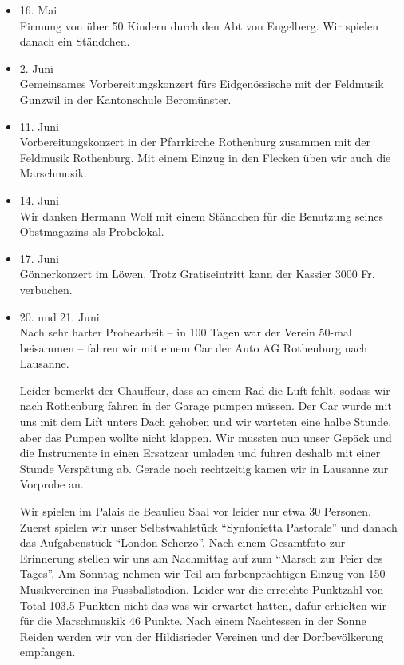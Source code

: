 \begin{multicols}{2}
\begin{itemize}
        \item[]16. Mai\\
        Firmung von über 50 Kindern durch den Abt von Engelberg. Wir spielen
        danach ein Ständchen.

        \item[]2. Juni\\
        Gemeinsames Vorbereitungskonzert fürs Eidgenössische mit der Feldmusik
        Gunzwil in der Kantonschule Beromünster.

        \item[]11. Juni\\
        Vorbereitungskonzert in der Pfarrkirche Rothenburg zusammen mit der
        Feldmusik Rothenburg. Mit einem Einzug in den Flecken üben wir auch die
        Marschmusik.

        \item[]14. Juni\\
        Wir danken Hermann Wolf mit einem Ständchen für die Benutzung seines
        Obstmagazins als Probelokal.

        \item[]17. Juni\\
        Gönnerkonzert im Löwen. Trotz Gratiseintritt kann der Kassier 3000 Fr.
        verbuchen.

        \item[]20. und 21. Juni\\
        Nach sehr harter Probearbeit -- in 100 Tagen war der Verein 50-mal
        beisammen -- fahren wir mit einem Car der Auto AG Rothenburg nach
        Lausanne.

        Leider bemerkt der Chauffeur, dass an einem Rad die Luft fehlt, sodass
        wir nach Rothenburg fahren in der Garage pumpen müssen. Der Car wurde
        mit uns mit dem Lift unters Dach gehoben und wir warteten eine halbe
        Stunde, aber das Pumpen wollte nicht klappen. Wir mussten nun unser
        Gepäck und die Instrumente in einen Ersatzcar umladen und fuhren deshalb
        mit einer Stunde Verspätung ab. Gerade noch rechtzeitig kamen wir in
        Lausanne zur Vorprobe an.

        Wir spielen im Palais de Beaulieu Saal vor leider nur etwa 30 Personen.
        Zuerst spielen wir unser Selbstwahlstück \enquote{Synfonietta Pastorale} und
        danach das Aufgabenstück \enquote{London Scherzo}. Nach einem Gesamtfoto zur
        Erinnerung stellen wir uns am Nachmittag auf zum \enquote{Marsch zur Feier des
            Tages}. Am Sonntag nehmen wir Teil am farbenprächtigen Einzug von 150
        Musikvereinen ins Fussballstadion. Leider war die erreichte Punktzahl
        von Total 103.5 Punkten nicht das was wir erwartet hatten, dafür
        erhielten wir für die Marschmuskik 46 Punkte. Nach einem Nachtessen in
        der Sonne Reiden werden wir von der Hildisrieder Vereinen und der
        Dorfbevölkerung empfangen.


\end{itemize}
\end{multicols}
